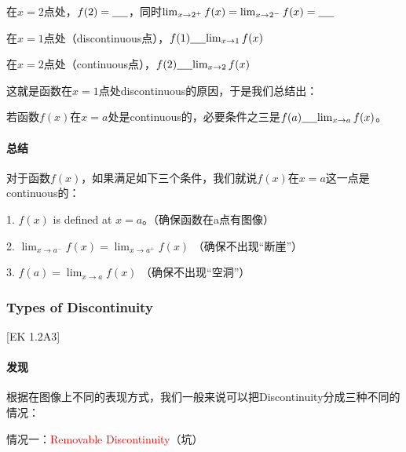 \documentclass[UTF8]{ctexart}
\begin{document}
在$x = 2$点处，$f(2) = \underline{\hbox to 5mm{}}$，同时${\lim_{x \to 2^+} f(x)} = {\lim_{x \to 2^-} f(x)} = \underline{\hbox to 5mm{}}$

在$x = 1$点处（discontinuous点），$f(1) \underline{\hbox to 5mm{}} {\lim_{x \to 1} f(x)}$

在$x = 2$点处（continuous点），$f(2) \underline{\hbox to 5mm{}} {\lim_{x \to 2} f(x)}$

这就是函数在$x=1$点处discontinuous的原因，于是我们总结出：

若函数$f(x)$在$x=a$处是continuous的，必要条件之三是$f(a) \underline{\hbox to 5mm{}} {\lim_{x \to a} f(x)}$。

\paragraph{总结}
对于函数$f(x)$，如果满足如下三个条件，我们就说$f(x)$在$x=a$这一点是continuous的：

1. $f(x)$ is defined at $x = a$。（确保函数在a点有图像）

2. ${\lim_{x \to a^-} f(x)} = {\lim_{x \to a^+} f(x)}$ （确保不出现“断崖”）

3. $f(a) = {\lim_{x \to a} f(x)}$ （确保不出现“空洞”）

\subsubsection{Types of Discontinuity}
[EK 1.2A3]

\paragraph{发现}
根据在图像上不同的表现方式，我们一般来说可以把Discontinuity分成三种不同的情况：

情况一：\textcolor{red}{Removable Discontinuity}（坑）
\begin{center}
\end{center}
\end{document}
